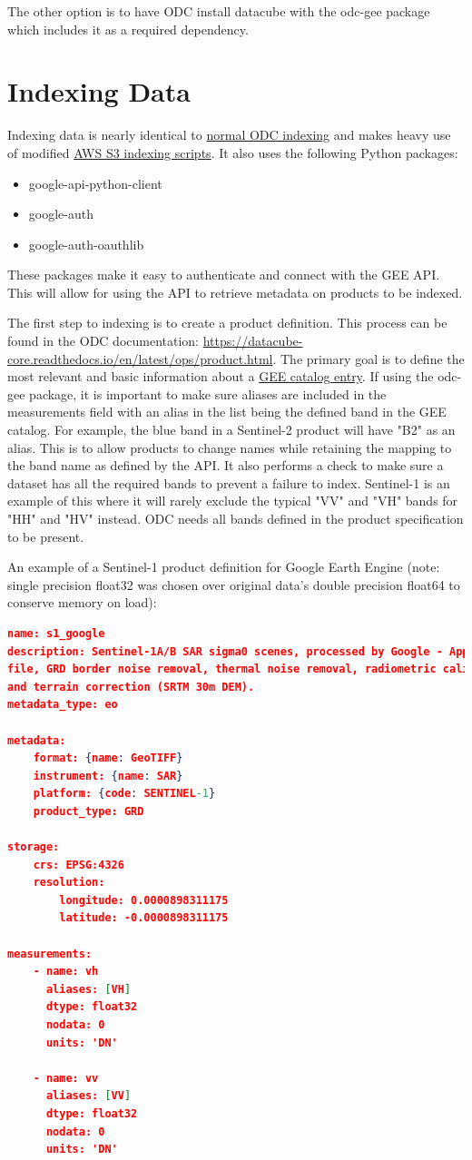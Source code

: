 \documentclass{article}
\begin{document}
The other option is to have ODC install datacube with the odc-gee package which
includes it as a required dependency.

\chapter{Indexing Data}
Indexing data is nearly identical to
\href{https://datacube-core.readthedocs.io/en/latest/ops/indexing.html}{normal
ODC indexing} and makes heavy use of modified
\href{https://github.com/opendatacube/datacube-dataset-config/blob/master/scripts/index_from_s3_bucket.py}{AWS
S3 indexing scripts}. It also uses the following Python packages:
\begin{itemize}
	\item google-api-python-client
	\item google-auth
	\item google-auth-oauthlib
\end{itemize}
These packages make it easy to authenticate and connect with the GEE API. This
will allow for using the API to retrieve metadata on products to be indexed.

The first step to indexing is to create a product definition. This
process can be found in the ODC documentation:
\url{https://datacube-core.readthedocs.io/en/latest/ops/product.html}. The
primary goal is to define the most relevant and basic information about a
\href{https://developers.google.com/earth-engine/datasets}{GEE catalog entry}.
If using the odc-gee package, it is important to make sure aliases are included
in the measurements field with an alias in the list being the defined
band in the GEE catalog. For example, the blue band in a Sentinel-2 product
will have "B2" as an alias. This is to allow products to change names
while retaining the mapping to the band name as defined by the API. It also
performs a check to make sure a dataset has all the required bands to prevent a
failure to index. Sentinel-1 is an example of this where it will rarely exclude
the typical "VV" and "VH" bands for "HH" and "HV" instead. ODC needs all bands
defined in the product specification to be present.

An example of a Sentinel-1 product definition for Google Earth Engine (note:
single precision float32 was chosen over original data's double precision
float64 to conserve memory on load):
\begin{lstlisting}[language=json]
name: s1_google
description: Sentinel-1A/B SAR sigma0 scenes, processed by Google - Apply orbit
file, GRD border noise removal, thermal noise removal, radiometric calibration,
and terrain correction (SRTM 30m DEM).
metadata_type: eo

metadata:
	format: {name: GeoTIFF}
	instrument: {name: SAR}
	platform: {code: SENTINEL-1}
	product_type: GRD

storage:
	crs: EPSG:4326
	resolution:
		longitude: 0.0000898311175
		latitude: -0.0000898311175

measurements:
	- name: vh
	  aliases: [VH]
	  dtype: float32
	  nodata: 0
	  units: 'DN'

	- name: vv
	  aliases: [VV]
	  dtype: float32
	  nodata: 0
	  units: 'DN'
\end{lstlisting}
\end{document}
